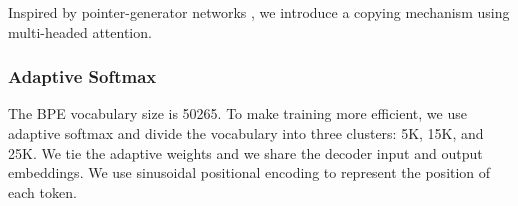 Inspired by pointer-generator networks \cite{See2017GetTT}, we introduce
a copying mechanism using multi-headed attention.

\subsubsection{Adaptive Softmax}

The BPE vocabulary size is 50265. To make training more efficient, we use adaptive softmax
\cite{Grave2016EfficientSA} and divide the vocabulary into three clusters: 5K,
15K, and 25K. We tie the adaptive weights and we share the decoder input and
output embeddings. We use sinusoidal positional encoding
\cite{Vaswani2017AttentionIA} to represent the position of each token.
